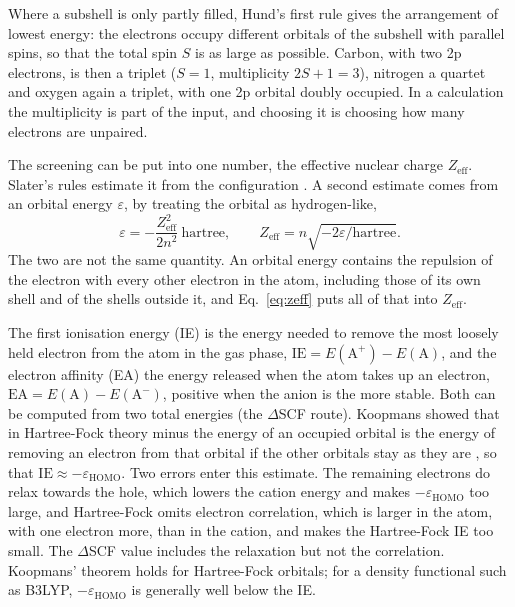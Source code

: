 Where a subshell is only partly filled, Hund's first rule gives the arrangement of lowest energy: the electrons occupy different orbitals of the subshell with parallel spins, so that the total spin $S$ is as large as possible. Carbon, with two 2p electrons, is then a triplet ($S = 1$, multiplicity $2S+1 = 3$), nitrogen a quartet and oxygen again a triplet, with one 2p orbital doubly occupied. In a calculation the multiplicity is part of the input, and choosing it is choosing how many electrons are unpaired.

The screening can be put into one number, the effective nuclear charge $Z_\mathrm{eff}$. Slater's rules estimate it from the configuration \cite{slater1930}. A second estimate comes from an orbital energy $\varepsilon$, by treating the orbital as hydrogen-like,
\begin{equation}
	\varepsilon = -\frac{Z_\mathrm{eff}^2}{2n^2}\ \text{hartree}, \qquad
	Z_\mathrm{eff} = n\sqrt{-2\varepsilon/\text{hartree}} .
	\label{eq:zeff}
\end{equation}
The two are not the same quantity. An orbital energy contains the repulsion of the electron with every other electron in the atom, including those of its own shell and of the shells outside it, and Eq.~\eqref{eq:zeff} puts all of that into $Z_\mathrm{eff}$.

The first ionisation energy (IE) is the energy needed to remove the most loosely held electron from the atom in the gas phase, $\mathrm{IE} = E(\mathrm{A}^+) - E(\mathrm{A})$, and the electron affinity (EA) the energy released when the atom takes up an electron, $\mathrm{EA} = E(\mathrm{A}) - E(\mathrm{A}^-)$, positive when the anion is the more stable. Both can be computed from two total energies (the $\Delta$SCF route). Koopmans showed that in Hartree-Fock theory minus the energy of an occupied orbital is the energy of removing an electron from that orbital if the other orbitals stay as they are \cite{koopmans1934}, so that $\mathrm{IE} \approx -\varepsilon_\mathrm{HOMO}$. Two errors enter this estimate. The remaining electrons do relax towards the hole, which lowers the cation energy and makes $-\varepsilon_\mathrm{HOMO}$ too large, and Hartree-Fock omits electron correlation, which is larger in the atom, with one electron more, than in the cation, and makes the Hartree-Fock IE too small. The $\Delta$SCF value includes the relaxation but not the correlation. Koopmans' theorem holds for Hartree-Fock orbitals; for a density functional such as B3LYP, $-\varepsilon_\mathrm{HOMO}$ is generally well below the IE.

